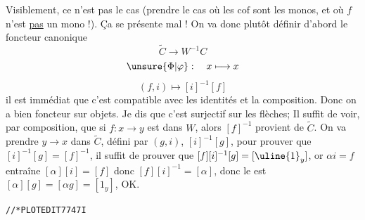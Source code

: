 Visiblement, ce n'est pas  le cas (prendre le cas où les $\mathrm{cof}$ sont les monos, et où $f$ n'est \uline{pas} un mono !). Ça se présente mal !
On va donc plutôt définir d'abord le foncteur canonique
\[\widetilde C\longrightarrow W^{-1}C\]
\[\unsure{\Phi|\varphi}:\quad x\longmapsto x\]
\[(f,i)\longmapsto[i]^{-1}[f]\]
il est immédiat que c'est compatible avec les identités et la composition. Donc on a bien foncteur   sur objets. Je dis que c'est surjectif sur les flèches; Il suffit de voir, par composition, que si $f:x\longrightarrow y$ est dans $W$, alors $[f]^{-1}$ provient de $\widetilde C$. On va prendre  $y\longrightarrow x$ dans $\widetilde C$, défini par $(g,i)$,  $[i]^{-1}[g]$, pour prouver que $[i]^{-1}[g]=[f]^{-1}$, il suffit de prouver que $[f][i]^{-1}[g]=[\uline{1}_y]$, or $\alpha i=f$ entraîne $[\alpha][i]=[f]$ donc $[f][i]^{-1}=[\alpha]$, donc le  est $[\alpha][g]=[\alpha g]=[1_y]$, OK.

\texttt{//*\quad PLOTEDIT7747\qquad I}

